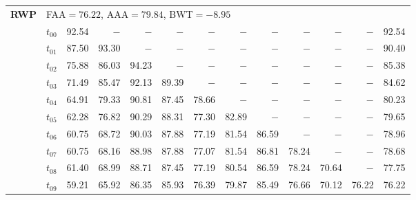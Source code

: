 \begin{table}[ht]
\begin{tabular}{@{}l l r r r r r r r r r r r@{}}
\midrule
\multirow{11}{*}{\textbf{RWP}} & \multicolumn{12}{l}{\quad\small FAA$=76.22$,\; AAA$=79.84$,\; BWT$=-8.95$} \\
 & $t_{00}$ & 92.54 & $-$ & $-$ & $-$ & $-$ & $-$ & $-$ & $-$ & $-$ & $-$ & 92.54 \\
 & $t_{01}$ & 87.50 & 93.30 & $-$ & $-$ & $-$ & $-$ & $-$ & $-$ & $-$ & $-$ & 90.40 \\
 & $t_{02}$ & 75.88 & 86.03 & 94.23 & $-$ & $-$ & $-$ & $-$ & $-$ & $-$ & $-$ & 85.38 \\
 & $t_{03}$ & 71.49 & 85.47 & 92.13 & 89.39 & $-$ & $-$ & $-$ & $-$ & $-$ & $-$ & 84.62 \\
 & $t_{04}$ & 64.91 & 79.33 & 90.81 & 87.45 & 78.66 & $-$ & $-$ & $-$ & $-$ & $-$ & 80.23 \\
 & $t_{05}$ & 62.28 & 76.82 & 90.29 & 88.31 & 77.30 & 82.89 & $-$ & $-$ & $-$ & $-$ & 79.65 \\
 & $t_{06}$ & 60.75 & 68.72 & 90.03 & 87.88 & 77.19 & 81.54 & 86.59 & $-$ & $-$ & $-$ & 78.96 \\
 & $t_{07}$ & 60.75 & 68.16 & 88.98 & 87.88 & 77.07 & 81.54 & 86.81 & 78.24 & $-$ & $-$ & 78.68 \\
 & $t_{08}$ & 61.40 & 68.99 & 88.71 & 87.45 & 77.19 & 80.54 & 86.59 & 78.24 & 70.64 & $-$ & 77.75 \\
 & $t_{09}$ & 59.21 & 65.92 & 86.35 & 85.93 & 76.39 & 79.87 & 85.49 & 76.66 & 70.12 & 76.22 & 76.22 \\
\bottomrule
\end{tabular}
\end{table}

